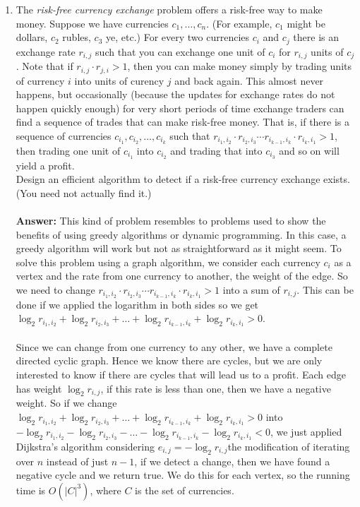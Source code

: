 \documentclass[12pt]{scrartcl}
\begin{document}
\begin{enumerate}
	\item The \textit{risk-free currency exchange} problem offers a risk-free way to make money. Suppose we have currencies $c_1, \ldots, c_n$. (For example, $c_1$ might be dollars, $c_2$ rubles, $c_3$ ye, etc.) For every two currencies $c_i$ and $c_j$ there is an exchange rate $r_{i,j}$ such that you can exchange one unit of $c_i$ for $r_{i,j}$ units of $c_j$. Note that if $r_{i,j} \cdot r_{j,i} > 1$, then you can make money simply by trading units of currency $i$ into units of curency $j$ and back again. This almost never happens, but occasionally (because the updates for exchange rates do not happen quickly enough) for very short periods of time exchange traders can find a sequence of trades that can make risk-free money. That is, if there is a sequence of currencies $c_{i_1}, c_{i_2}, \ldots, c_{i_k}$ such that $r_{i_1,i_2 } \cdot r_{i_2,i_3 } \cdots r_{i_{k-1},i_k}  \cdot r_{i_k,i_1 } > 1$, then trading one unit of $c_{i_1}$ into $c_{i_2}$ and trading that into $c_{i_3}$ and so on will yield a profit. \\
	Design an efficient algorithm to detect if a risk-free currency exchange exists. (You need not actually find it.)\\
	\\
	\textbf{Answer: } This kind of problem resembles to problems used to show the benefits of using greedy algorithms or dynamic programming. In this case, a greedy algorithm will work but not as straightforward as it might seem. To solve this problem using a graph algorithm, we consider each currency $c_i$ as a vertex and the rate from one currency to another, the weight of the edge. So we need to change $r_{i_1,i_2 } \cdot r_{i_2,i_3 } \cdots r_{i_{k-1},i_k}  \cdot r_{i_k,i_1 } > 1$ into a sum of $r_{i,j}$. This can be done if we applied the logarithm in both sides so we get $\log_2{r_{i_1,i_2 }} + \log_2{r_{i_2,i_3 }} + \ldots +  \log_2{r_{i_{k-1},i_k}}  + \log_2{r_{i_k,i_1 }} > 0$. \\
	\\
	Since we can change from one currency to any other, we have a complete directed cyclic graph. Hence we know there are cycles, but we are only interested to know if there are cycles that will lead us to a profit. Each edge has weight $\log_2{r_{i,j}}$, if this rate is less than one, then we have a negative weight. So if we change $\log_2{r_{i_1,i_2 }} + \log_2{r_{i_2,i_3 }} + \ldots +  \log_2{r_{i_{k-1},i_k}}  + \log_2{r_{i_k,i_1 }} > 0$ into $-\log_2{r_{i_1,i_2 }} - \log_2{r_{i_2,i_3 }} - \ldots -  \log_2{r_{i_{k-1},i_k}}  - \log_2{r_{i_k,i_1 }} < 0$, we just applied Dijkstra's algorithm considering $e_{i,j} = -\log_2{r_{i,j}}$the modification of iterating over $n$ instead of just $n -1$, if we detect a change, then we have found a negative cycle and we return true. We do this for each vertex, so the running time is $O(|C|^3)$, where $C$ is the set of currencies.
	
\end{enumerate}
\end{document}
